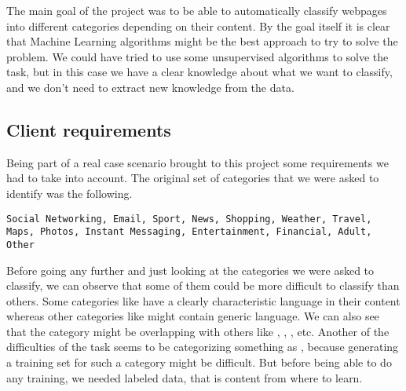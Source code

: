 
The main goal of the project was to be able to automatically classify webpages into different categories depending on their content. 
By the goal itself it is clear that Machine Learning algorithms might be the best approach to try to solve the problem. We could have tried to use some unsupervised algorithms to solve the task,
but in this case we have a clear knowledge about what we want to classify, and we don't need to extract new knowledge from the data.

\subsection{Client requirements}

Being part of a real case scenario brought to this project some requirements we had to take into account. The original set of categories that we were asked to identify was the following.


\begin{lstlisting}
Social Networking, Email, Sport, News, Shopping, Weather, Travel, Maps, Photos, Instant Messaging, Entertainment, Financial, Adult, Other
\end{lstlisting}

Before going any further and just looking at the categories we were asked to classify, we can observe that some of them could be more difficult to classify than others.
Some categories like  have a clearly characteristic language in their content whereas other categories like  might contain generic language.
We can also see that the category  might be overlapping with others like , , , etc. 
Another of the difficulties of the task seems to be categorizing something as , because generating a training set for such a category might be difficult. 
But before being able to do any training, we needed labeled data, that is content from where to learn.

